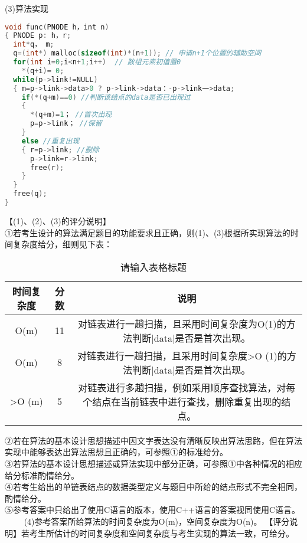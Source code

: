 (3)算法实现 \\
\begin{lstlisting}[language=cpp]
void func(PNODE h，int n)
{ PNODE p: h，r;
  int*q， m;
  q=(int*) malloc(sizeof(int)*(n+1)); // 申请n+1个位置的辅助空间
  for(int i=0;i<n+1;i++)  // 数组元素初值置0
    *(q+i)= 0;
  while(p->link!=NULL)
  { m=p->link->data>0 ? p->link->data：-p->link一>data;
    if(*(q+m)==0) //判断该结点的data是否已出现过
    { 
      *(q+m)=1； //首次出现
      p=p->link； //保留
    }
    else //重复出现
    { r=p->link; //删除
      p->link=r->link;
      free(r);
    }
  }
  free(q);
}
\end{lstlisting}
【(1)、(2)、(3)的评分说明】 \\
①若考生设计的算法满足题目的功能要求且正确，则(1)、(3)根据所实现算法的时间复杂度给分，细则见下表：
\begin{table}[ht]
\centering
\caption{请输入表格标题}\label{tab_CSN15_2}
\begin{tabular}{|c|c|c|}
\hline
时间复杂度 &分数 &说明  \\
\hline
O(m) &11 &对链表进行一趟扫描，且采用时间复杂度为O(1)的方法判断|data|是否是首次出现。  \\
\hline
O(m) &8 &对链表进行一趟扫描，且采用时间复杂度>O (1)的方法判断|data|是否是首次出现。  \\
\hline
>O (m) &5 &对链表进行多趟扫描，例如采用顺序查找算法，对每个结点在当前链表中进行查找，删除重复出现的结点。  \\
\hline
\end{tabular}
\end{table}
②若在算法的基本设计思想描述中因文字表达没有清晰反映出算法思路，但在算法实现中能够表达出算法思想且正确的，可参照①的标准给分。 \\
③若算法的基本设计思想描述或算法实现中部分正确，可参照①中各种情况的相应给分标准酌情给分。\\
④若考生给出的单链表结点的数据类型定义与题目中所给的结点形式不完全相同，酌情给分。 \\
⑤参考答案中只给出了使用C语言的版本，使用C++语言的答案视同使用C语言。 \\
$\qquad$ (4)参考答案所给算法的时间复杂度为O(m)，空间复杂度为O(n)。
【评分说明】若考生所估计的时间复杂度和空间复杂度与考生实现的算法一致，可给分。

